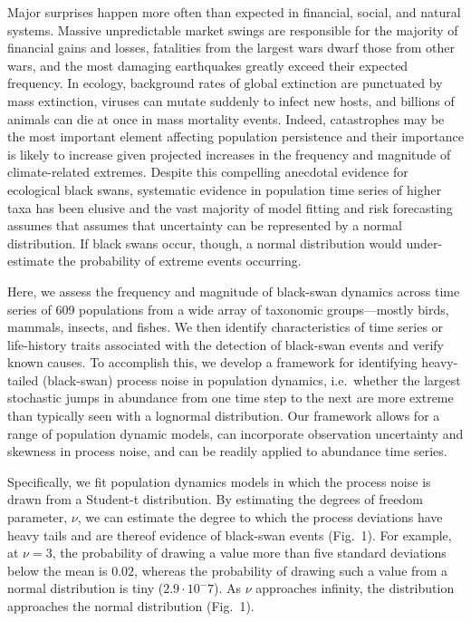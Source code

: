 \clearpage

Major surprises happen more often than expected in financial, social, and natural systems\cite{taleb2007, may2008}. Massive unpredictable market swings are responsible for the majority of financial gains and losses\cite{taleb2007}, fatalities from the largest wars dwarf those from other wars\cite{newman2005}, and the most damaging earthquakes greatly exceed their expected frequency\cite{sornette2009}. In ecology, background rates of global extinction are punctuated by mass extinction\cite{harnik2012}, viruses can mutate suddenly to infect new hosts, and billions of animals can die at once in mass mortality events\cite{fey2015}. Indeed, catastrophes may be the most important element affecting population persistence\cite{mangel1994} and their importance is likely to increase given projected increases in the frequency and magnitude of climate-related extremes\cite{ipcc2012}. Despite this compelling anecdotal evidence for ecological black swans, systematic evidence in population time series of higher taxa has been elusive\cite{keitt1998, allen2001, halley2002} and the vast majority of model fitting and risk forecasting assumes that assumes that uncertainty can be represented by a normal distribution\cite{brook2006a, dennis2006, knape2012}. If black swans occur, though, a normal distribution would under-estimate the probability of extreme events occurring.

Here, we assess the frequency and magnitude of black-swan dynamics across time series of 609 populations from a wide array of taxonomic groups---mostly birds, mammals, insects, and fishes. We then identify characteristics of time series or life-history traits associated with the detection of black-swan events and verify known causes. To accomplish this, we develop a framework for identifying heavy-tailed (black-swan) process noise in population dynamics, i.e.~whether the largest stochastic jumps in abundance from one time step to the next are more extreme than typically seen with a lognormal distribution. Our framework allows for a range of population dynamic models, can incorporate observation uncertainty and skewness in process noise, and can be readily applied to abundance time series.

Specifically, we fit population dynamics models in which the process noise is drawn from a Student-t distribution\emph{.} By estimating the degrees of freedom parameter, \(\nu\), we can estimate the degree to which the process deviations have heavy tails and are thereof evidence of black-swan events (Fig.~1). For example, at \(\nu = 3\), the probability of drawing a value more than five standard deviations below the mean is \(0.02\), whereas the probability of drawing such a value from a normal distribution is tiny (\(2.9\cdot10^-7\)). As \(\nu\) approaches infinity, the distribution approaches the normal distribution (Fig.~1).

